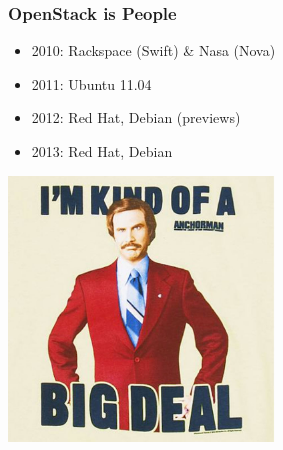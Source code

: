 \begin{frame}
\frametitle{OpenStack is People}



\begin{itemize}
\item 2010: Rackspace (Swift) \& Nasa (Nova)
\item 2011: Ubuntu 11.04 %
\item 2012: Red Hat, Debian (previews)
\item 2013: Red Hat, Debian
\end{itemize}
\end{frame}

\begin{frame}
\begin{center}
     \includegraphics[width=200pt]{images/bigdeal.jpg}
\end{center}
\end{frame}



